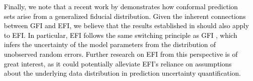 \documentclass[11pt]{article}
\begin{document}
\textcolor{black}{Finally, we note that a recent work by \citet{williams2023modelfreeGFI} demonstrates how conformal prediction sets arise from a  generalized fiducial distribution.
 Given the inherent connections between GFI and EFI, we believe that the results established in \citet{williams2023modelfreeGFI} should also apply to EFI. In particular, EFI follows the same switching principle as GFI \citep{hannig2016gfi}, which infers the uncertainty of the model parameters from the distribution of unobserved random errors.
 Further research on EFI from this perspective is of great interest, as it could potentially alleviate EFI's reliance on assumptions about the underlying data distribution in prediction uncertainty quantification.
} 
\end{document}
